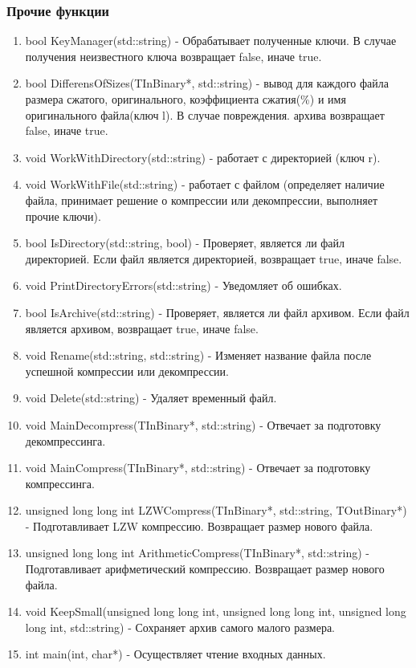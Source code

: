 \documentclass[12pt]{article}
\begin{document}
\subsubsection*{Прочие функции}
\noindent
\begin{enumerate}
	\item bool KeyManager(std::string) - Обрабатывает полученные ключи. В случае получения неизвестного ключа возвращает false, иначе true.
	\item bool DifferensOfSizes(TInBinary*, std::string) - вывод для каждого файла размера сжатого, оригинального, коэффициента сжатия(\%) и имя оригинального файла(ключ l). В случае повреждения. архива возвращает false, иначе true.
	\item void WorkWithDirectory(std::string) - работает с директорией (ключ r).
	\item void WorkWithFile(std::string) - работает с файлом (определяет наличие файла, принимает решение о компрессии или декомпрессии, выполняет прочие ключи).
	\item bool IsDirectory(std::string, bool) - Проверяет, является ли файл директорией. Если файл является директорией, возвращает true, иначе false.
	\item void PrintDirectoryErrors(std::string) - Уведомляет об ошибках.
	\item bool IsArchive(std::string) - Проверяет, является ли файл архивом. Если файл является архивом, возвращает true, иначе false.
	\item void Rename(std::string, std::string) - Изменяет название файла после успешной компрессии или декомпрессии.
	\item void Delete(std::string) - Удаляет временный файл.
	\item void MainDecompress(TInBinary*, std::string) - Отвечает за подготовку декомпрессинга.
	\item void MainCompress(TInBinary*, std::string) - Отвечает за подготовку компрессинга.
	\item unsigned long long int LZWCompress(TInBinary*, std::string, TOutBinary*) - Подготавливает LZW компрессию. Возвращает размер нового файла.
	\item unsigned long long int ArithmeticCompress(TInBinary*, std::string) - Подготавливает арифметический компрессию. Возвращает размер нового файла.
	\item void KeepSmall(unsigned long long int, unsigned long long int,%
	unsigned long long int, std::string) - Сохраняет архив самого малого размера.
	\item int main(int, char*) - Осуществляет чтение входных данных.
\end{enumerate}
\end{document}
